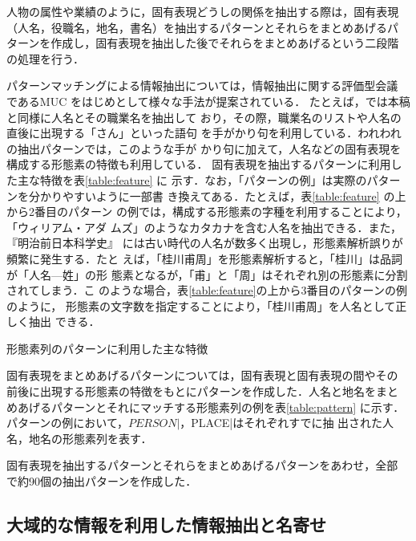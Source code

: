 \documentclass[japanese]{jnlp_1.4}
\def\|{}
\begin{document}
人物の属性や業績のように，固有表現どうしの関係を抽出する際は，固有表現
（人名，役職名，地名，書名）を抽出するパターンとそれらをまとめあげるパ
ターンを作成し，固有表現を抽出した後でそれらをまとめあげるという二段階
の処理を行う．

パターンマッチングによる情報抽出については，情報抽出に関する評価型会議
であるMUC \cite{grishman1996}をはじめとして様々な手法が提案されている．
たとえば，\cite{nishino1998}では本稿と同様に人名とその職業名を抽出して
おり，その際，職業名のリストや人名の直後に出現する「さん」といった語句
を手がかり句を利用している．われわれの抽出パターンでは，このような手が
かり句に加えて，人名などの固有表現を構成する形態素の特徴も利用している．
固有表現を抽出するパターンに利用した主な特徴を表\ref{table:feature} に
示す．なお，「パターンの例」は実際のパターンを分かりやすいように一部書
き換えてある．たとえば，表\ref{table:feature} の上から2番目のパターン
の例では，構成する形態素の字種を利用することにより，「ウィリアム・アダ
ムズ」のようなカタカナを含む人名を抽出できる．また，『明治前日本科学史』
には古い時代の人名が数多く出現し，形態素解析誤りが頻繁に発生する．たと
えば，「桂川甫周」を形態素解析すると，「桂川」は品詞が「人名—姓」の形
態素となるが，「甫」と「周」はそれぞれ別の形態素に分割されてしまう．こ
のような場合，表\ref{table:feature}の上から3番目のパターンの例のように，
形態素の文字数を指定することにより，「桂川甫周」を人名として正しく抽出
できる．

\begin{table}[b]
\caption{形態素列のパターンに利用した主な特徴}
\label{table:feature}
\begin{center}

\end{center}
\end{table}

固有表現をまとめあげるパターンについては，固有表現と固有表現の間やその
前後に出現する形態素の特徴をもとにパターンを作成した．人名と地名をまと
めあげるパターンとそれにマッチする形態素列の例を表\ref{table:pattern} 
に示す．パターンの例において，\|$PERSON|，\|$PLACE|はそれぞれすでに抽
出された人名，地名の形態素列を表す．

固有表現を抽出するパターンとそれらをまとめあげるパターンをあわせ，全部
で約90個の抽出パターンを作成した．



\subsection{大域的な情報を利用した情報抽出と名寄せ}
\end{document}

